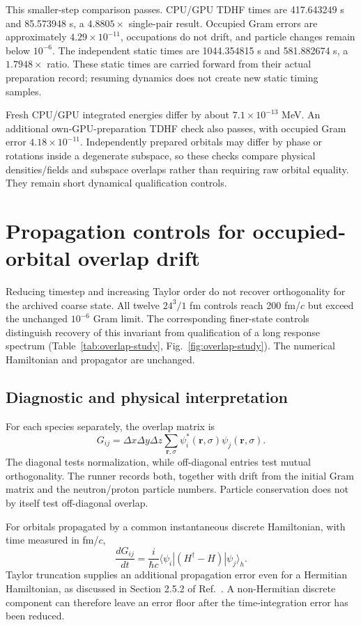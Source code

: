 \documentclass[11pt,a4paper]{article}
\begin{document}
This smaller-step comparison passes. CPU/GPU TDHF times are 417.643249 s
and 85.573948 s, a $4.8805\times$ single-pair result. Occupied Gram errors
are approximately $4.29\times10^{-11}$, occupations do not drift, and
particle changes remain below $10^{-6}$. The independent static times
are 1044.354815 s and 581.882674 s, a $1.7948\times$ ratio. These static
times are carried forward from their actual preparation record; resuming
dynamics does not create new static timing samples.

Fresh CPU/GPU integrated energies differ by about $7.1\times10^{-13}$ MeV.
An additional own-GPU-preparation TDHF check also passes, with occupied Gram
error $4.18\times10^{-11}$. Independently prepared orbitals may differ by
phase or rotations inside a degenerate subspace, so these checks compare
physical densities/fields and subspace overlaps rather than requiring raw
orbital equality. They remain short dynamical qualification controls.

\section{Propagation controls for occupied-orbital overlap drift}
\label{app:overlap-study}
Reducing timestep and increasing Taylor order do not recover orthogonality
for the archived coarse state. All twelve $24^3/1$ fm controls reach
200 fm/$c$ but exceed the unchanged $10^{-6}$ Gram limit. The corresponding
finer-state controls distinguish recovery of this invariant from qualification
of a long response spectrum (Table~\ref{tab:overlap-study},
Fig.~\ref{fig:overlap-study}). The numerical Hamiltonian and propagator are
unchanged.

\subsection{Diagnostic and physical interpretation}
For each species separately, the overlap matrix is
\begin{equation}
 G_{ij}=\Delta x\Delta y\Delta z\sum_{\boldsymbol r,\sigma}
 \psi_i^*(\boldsymbol r,\sigma)\psi_j(\boldsymbol r,\sigma).
\end{equation}
The diagonal tests normalization, while off-diagonal entries test mutual
orthogonality. The runner records both, together with drift from the initial
Gram matrix and the neutron/proton particle numbers. Particle conservation
does not by itself test off-diagonal overlap.

For orbitals propagated by a common instantaneous discrete Hamiltonian,
with time measured in fm/$c$,
\begin{equation}
 \frac{dG_{ij}}{dt}=\frac{i}{\hbar c}
 \langle\psi_i|(H^\dagger-H)|\psi_j\rangle_h.
\end{equation}
Taylor truncation supplies an additional propagation error even for a
Hermitian Hamiltonian, as discussed in Section 2.5.2 of
Ref.~\cite{sky3d}. A non-Hermitian discrete component can therefore leave
an error floor after the time-integration error has been reduced.
\end{document}
